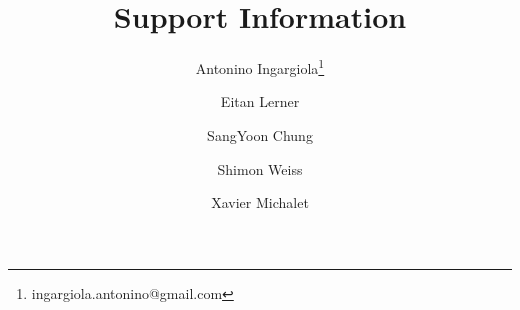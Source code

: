 
\title{{\sc Support Information}\\ \vspace{1em} }

\author[1]{Antonino Ingargiola\thanks{ingargiola.antonino@gmail.com}}
\author[1]{Eitan Lerner}
\author[1]{SangYoon Chung}
\author[1]{Shimon Weiss}
\author[1]{Xavier Michalet}
\date{}


\verbatimfont{\small}
\lstset{language=Python}

\onecolumn
\maketitle

\setcounter{figure}{0}
\renewcommand{\thefigure}{S\arabic{figure}}%
